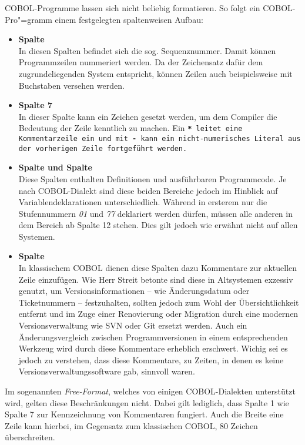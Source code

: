 COBOL-Programme lassen sich nicht beliebig formatieren. So folgt ein COBOL-Pro"=gramm einem festgelegten spaltenweisen Aufbau:
\begin{itemize}
    \item \textbf{Spalte }\\
    In diesen Spalten befindet sich die sog. Sequenznummer. Damit können Programmzeilen nummeriert werden. Da der Zeichensatz dafür dem zugrundeliegenden System entspricht, können Zeilen auch beispielsweise mit Buchstaben versehen werden.
    \item \textbf{Spalte 7}\\
    In dieser Spalte kann ein Zeichen gesetzt werden, um dem Compiler die Bedeutung der Zeile kenntlich zu machen. Ein \tt{\textbf{*}} leitet \zB eine Kommentarzeile ein und mit \tt{\textbf{-}} kann ein nicht-numerisches Literal aus der vorherigen Zeile fortgeführt werden.
    \item \textbf{Spalte  und Spalte }\\
    Diese Spalten enthalten Definitionen und ausführbaren Programmcode. Je nach COBOL-Dialekt sind diese beiden Bereiche jedoch im Hinblick auf Variablendeklarationen unterschiedlich. Während in ersterem nur die Stufennummern \textit{01} und \textit{77} deklariert werden dürfen, müssen alle anderen in dem Bereich ab Spalte 12 stehen. Dies gilt jedoch wie erwähnt nicht auf allen Systemen.
    \item \textbf{Spalte }\\
    In klassischem COBOL dienen diese Spalten dazu Kommentare zur aktuellen Zeile einzufügen. Wie Herr Streit betonte sind diese in Altsystemen exzessiv genutzt, um Versionsinformationen -- wie Änderungsdatum oder Ticketnummern -- festzuhalten, sollten jedoch zum Wohl der Übersichtlichkeit entfernt und im Zuge einer Renovierung oder Migration durch eine modernen Versionsverwaltung wie \zB SVN oder Git ersetzt werden. Auch ein Änderungsvergleich zwischen Programmversionen in einem entsprechenden Werkzeug wird durch diese Kommentare erheblich erschwert. Wichig sei es jedoch zu verstehen, dass diese Kommentare, zu Zeiten, in denen es keine Versionsverwaltungssoftware gab, sinnvoll waren.
\end{itemize}

Im sogenannten \textit{Free-Format}, welches von einigen COBOL-Dialekten unterstützt wird, gelten diese Beschränkungen nicht. Dabei gilt lediglich, dass Spalte 1 wie Spalte 7 zur Kennzeichnung von Kommentaren fungiert. Auch die Breite eine Zeile kann hierbei, im Gegensatz zum klassischen COBOL, 80 Zeichen überschreiten. 